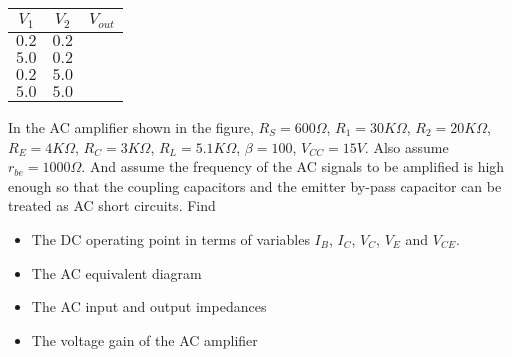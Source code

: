 \begin{enumerate}
\begin{tabular}{cc|c}\hline
$V_1$ & $V_2$ & $V_{out}$ \\ \hline
  $0.2$ & $0.2$ &         \\
  $5.0$ & $0.2$ &         \\
  $0.2$ & $5.0$ &         \\
  $5.0$ & $5.0$ &         \hline
\end{tabular}




\end{enumerate}




\item In the AC amplifier shown in the figure, $R_S=600\Omega$, $R_1=30K\Omega$, 
$R_2=20K\Omega$, $R_E=4K\Omega$, $R_C=3K\Omega$, $R_L=5.1K\Omega$, 
$\beta=100$, $V_{CC}=15V$. Also assume $r_{be}=1000\Omega$. And assume the
frequency of the AC signals to be amplified is high enough so that the
coupling capacitors and the emitter by-pass capacitor can be treated as 
AC short circuits. Find
\begin{itemize}
\item The DC operating point in terms of variables $I_B$, $I_C$, $V_C$, $V_E$ 
  and $V_{CE}$.
\item The AC equivalent diagram
\item The AC input and output impedances
\item The voltage gain of the AC amplifier
\end{itemize}


